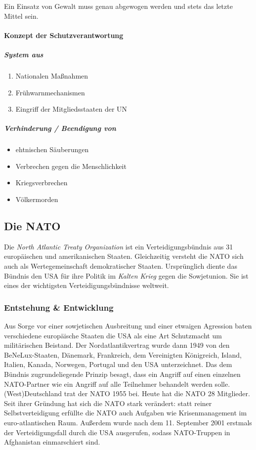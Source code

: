 \documentclass{article}
\begin{document}
	Ein Einsatz von Gewalt muss genau abgewogen werden und stets das letzte Mittel sein.

	\paragraph{Konzept der Schutzverantwortung}
	\subparagraph{System aus}
	
	\begin{enumerate}
		\item Nationalen Maßnahmen
		\item Frühwarnmechanismen
		\item Eingriff der Mitgliedsstaaten der UN
	\end{enumerate}

	\subparagraph{Verhinderung / Beendigung von}

	\begin{itemize}
		\item ehtnischen Säuberungen
		\item Verbrechen gegen die Menschlichkeit
		\item Kriegsverbrechen
		\item Völkermorden
	\end{itemize}

	\subsection{Die NATO}
	Die \textit{North Atlantic Treaty Organization} ist ein Verteidigungsbündnis aus 31 europäischen und amerikanischen Staaten. Gleichzeitig versteht die NATO sich auch als Wertegemeinschaft demokratischer Staaten. Ursprünglich diente das Bündnis den USA für ihre Politik im \textit{Kalten Krieg} gegen die Sowjetunion. Sie ist eines der wichtigsten Verteidigungsbündnisse weltweit.

	\subsubsection{Entstehung \& Entwicklung}
	Aus Sorge vor einer sowjetischen Ausbreitung und einer etwaigen Agression baten verschiedene europäische Staaten die USA als eine Art Schutzmacht um militärischen Beistand. Der Nordatlantikvertrag wurde dann 1949 von den BeNeLux-Staaten, Dänemark, Frankreich, dem Vereinigten Königreich, Island, Italien, Kanada, Norwegen, Portugal und den USA unterzeichnet. Das dem Bündnis zugrundeliegende Prinzip besagt, dass ein Angriff auf einen einzelnen NATO-Partner wie ein Angriff auf alle Teilnehmer behandelt werden solle. (West)Deutschland trat der NATO 1955 bei. Heute hat die NATO 28 Mitglieder. Seit ihrer Gründung hat sich die NATO stark verändert: statt reiner Selbstverteidigung erfüllte die NATO auch Aufgaben wie Krisenmanagement im euro-atlantischen Raum. Außerdem wurde nach dem 11. September 2001 erstmals der Verteidigungsfall durch die USA ausgerufen, sodass NATO-Truppen in Afghanistan einmarschiert sind.
\end{document}
